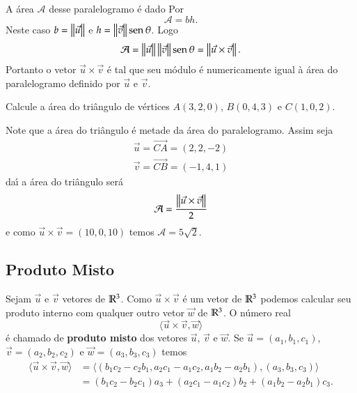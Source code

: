 A \'area $\mathcal{A}$ desse paralelogramo \'e dado Por
\[
  \mathcal{A} = bh.
\]
Neste caso $b = \left\Vert{\vec{u}}\right\Vert$ e $h = \left\Vert{\vec{v}}\right\Vert{\rm sen\,}\theta$. Logo
\[
  \mathcal{A} = \left\Vert{\vec{u}}\right\Vert\left\Vert{\vec{v}}\right\Vert{\rm sen\,}\theta = \left\Vert{\vec{u}\times\vec{v}}\right\Vert.
\]
Portanto o vetor $\vec{u}\times\vec{v}$ \'e tal que seu m\'odulo \'e numericamente igual \`a \'area do paralelogramo definido por $\vec{u}$ e $\vec{v}$.
\begin{exemplo}
  Calcule a \'area do tri\^angulo de v\'ertices $A(3,2,0)$, $B(0,4,3)$ e $C(1,0,2)$.
  \begin{solucao}
    Note que a \'area do tri\^angulo \'e metade da \'area do paralelogramo. Assim seja
    \begin{align*}
      \vec{u} = \vec{CA} = (2,2,-2)\\
      \vec{v} = \vec{CB} = (-1,4,1)
    \end{align*}
    da{\'\i} a \'area do tri\^angulo ser\'a
    \[
      \mathcal{A} = \dfrac{\left\Vert{\vec{u}\times\vec{v}}\right\Vert}{2}
    \]
    e como $\vec{u}\times\vec{v} = (10,0,10)$ temos $\mathcal{A} = 5\sqrt{2}$.
  \end{solucao}
\end{exemplo}

\subsection{Produto Misto} %
\label{sub:produto_misto}

Sejam $\vec{u}$ e $\vec{v}$ vetores de $\mathbb{R}^3$. Como $\vec{u}\times\vec{v}$ \'e um vetor de $\mathbb{R}^3$ podemos calcular seu produto interno com qualquer outro vetor $\vec{w}$ de $\mathbb{R}^3$. O n\'umero real
\begin{equation}
  \langle\vec{u}\times\vec{v}, \vec{w}\rangle
\end{equation}
\'e chamado de \textbf{produto misto} dos vetores $\vec{u}$, $\vec{v}$ e $\vec{w}$. Se $\vec{u} = (a_1,b_1,c_1)$, $\vec{v} =(a_2,b_2,c_2)$ e $\vec{w} = (a_3,b_3,c_3)$ temos
\begin{align*}
  \langle\vec{u}\times\vec{v}, \vec{w}\rangle &= \langle(b_1c_2 - c_2b_1,a_2c_1 - a_1c_2, a_1b_2 - a_2b_1), (a_3, b_3, c_3)\rangle \\ &= (b_1c_2 - b_2c_1)a_3 + (a_2c_1 - a_1c_2)b_2 + (a_1b_2 - a_2b_1)c_3.
\end{align*}

